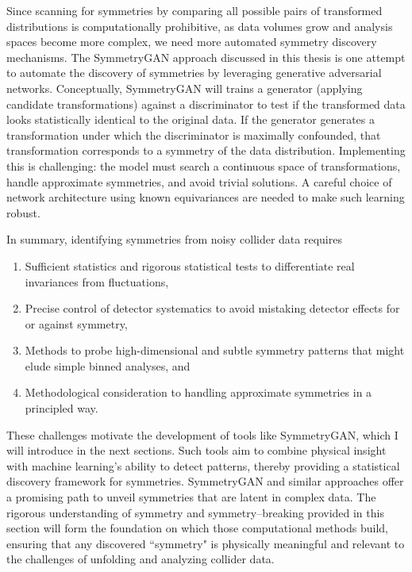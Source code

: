             Since scanning for symmetries by comparing all possible pairs of transformed distributions is computationally prohibitive, as data volumes grow and analysis spaces become more complex, we need more automated symmetry discovery mechanisms.
            The SymmetryGAN approach discussed in this thesis is one attempt to automate the discovery of symmetries by leveraging generative adversarial networks.
            Conceptually, SymmetryGAN will trains a generator (applying candidate transformations) against a discriminator to test if the transformed data looks statistically identical to the original data.
            If the generator generates a transformation under which the discriminator is maximally confounded, that transformation corresponds to a symmetry of the data distribution.
            Implementing this is challenging: the model must search a continuous space of transformations, handle approximate symmetries, and avoid trivial solutions.
            A careful choice of network architecture using known equivariances are needed to make such learning robust.

            In summary, identifying symmetries from noisy collider data requires
            \begin{enumerate}
                \item Sufficient statistics and rigorous statistical tests to differentiate real invariances from fluctuations,
                \item Precise control of detector systematics to avoid mistaking detector effects for or against symmetry,
                \item Methods to probe high-dimensional and subtle symmetry patterns that might elude simple binned analyses, and
                \item Methodological consideration to handling approximate symmetries in a principled way.
            \end{enumerate}
            These challenges motivate the development of tools like SymmetryGAN, which I will introduce in the next sections.
            Such tools aim to combine physical insight with machine learning's ability to detect patterns, thereby providing a statistical discovery framework for symmetries.
            SymmetryGAN and similar approaches offer a promising path to unveil symmetries that are latent in complex data.
            The rigorous understanding of symmetry and symmetry--breaking provided in this section will form the foundation on which those computational methods build, ensuring that any discovered ``symmetry" is physically meaningful and relevant to the challenges of unfolding and analyzing collider data.

